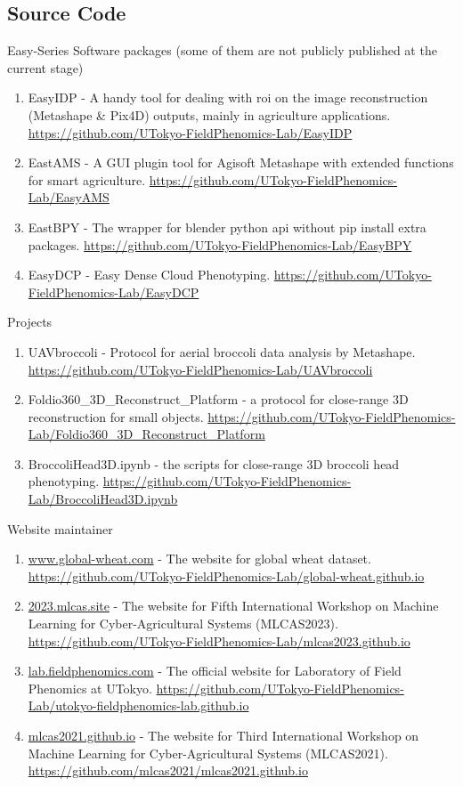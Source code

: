 \begin{singlespace}
\section*{Source Code}

\noindent
Easy-Series Software packages (some of them are not publicly published at the current stage)

\begin{enumerate}
  \item EasyIDP - A handy tool for dealing with \gls{roi} on the image reconstruction (Metashape \& Pix4D) outputs, mainly in agriculture applications. \url{https://github.com/UTokyo-FieldPhenomics-Lab/EasyIDP}
  \item EastAMS - A GUI plugin tool for Agisoft Metashape with extended functions for smart agriculture. \url{https://github.com/UTokyo-FieldPhenomics-Lab/EasyAMS}
  \item EastBPY - The wrapper for blender python \gls{api} without pip install extra packages. \url{https://github.com/UTokyo-FieldPhenomics-Lab/EasyBPY}
  \item EasyDCP - Easy Dense Cloud Phenotyping. \url{https://github.com/UTokyo-FieldPhenomics-Lab/EasyDCP}
\end{enumerate}

\noindent
Projects

\begin{enumerate}
  \item UAVbroccoli - Protocol for aerial broccoli data analysis by Metashape. \url{https://github.com/UTokyo-FieldPhenomics-Lab/UAVbroccoli}
  \item Foldio360\_3D\_Reconstruct\_Platform - a protocol for close-range 3D reconstruction for small objects. \url{https://github.com/UTokyo-FieldPhenomics-Lab/Foldio360_3D_Reconstruct_Platform}
  \item BroccoliHead3D.ipynb - the scripts for close-range 3D broccoli head phenotyping. \url{https://github.com/UTokyo-FieldPhenomics-Lab/BroccoliHead3D.ipynb}
\end{enumerate}

\noindent
Website maintainer

\begin{enumerate}
  \item \url{www.global-wheat.com} - The website for global wheat dataset. \url{https://github.com/UTokyo-FieldPhenomics-Lab/global-wheat.github.io}
  \item \url{2023.mlcas.site} - The website for Fifth International Workshop on Machine Learning for Cyber-Agricultural Systems (MLCAS2023). \url{https://github.com/UTokyo-FieldPhenomics-Lab/mlcas2023.github.io}
  \item \url{lab.fieldphenomics.com} - The official website for Laboratory of Field Phenomics at UTokyo. \url{https://github.com/UTokyo-FieldPhenomics-Lab/utokyo-fieldphenomics-lab.github.io}
  \item \url{mlcas2021.github.io} - The website for Third International Workshop on Machine Learning for Cyber-Agricultural Systems (MLCAS2021). \url{https://github.com/mlcas2021/mlcas2021.github.io}
\end{enumerate}

\end{singlespace}